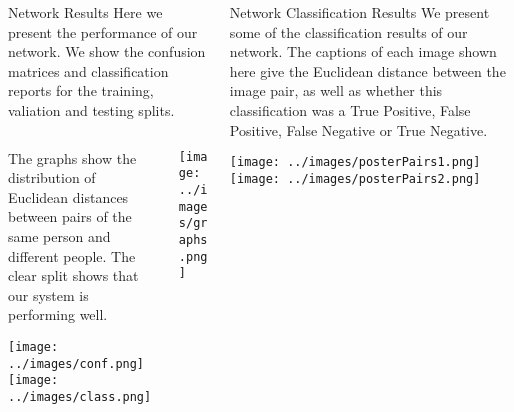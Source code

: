 \documentclass[final]{beamer}
\begin{document}
\begin{frame}{}
\begin{columns}[t]
\begin{column}{.5\linewidth}
        \begin{block}{Network Results}
        Here we present the performance of our network. We show the confusion matrices and classification reports for the training, valiation and testing splits. 
		    \begin{columns}[t]
		    
				\begin{column}{.45\linewidth}
				
				The graphs show the distribution of Euclidean distances between pairs of the same person and different people. The clear split shows that our system is performing well.
				
				\vspace{1cm}
				\texttt{[image: ../images/conf.png]}  
				\vspace{.5cm}
			 	\texttt{[image: ../images/class.png]}
			 	  
				\end{column}
		
				\begin{column}{.45\linewidth}
				
					\texttt{[image: ../images/graphs.png]}
					  
				\end{column}
		
		
			\end{columns}
		
 		
        \end{block}
        
        
    
    
	 \end{column}
	 \begin{column}{.5\linewidth}
 		
 		\begin{block}{Network Classification Results}
        We present some of the classification results of our network. The captions of each image shown here give the Euclidean distance between the image pair, as well as whether this classification was a True Positive, False Positive, False Negative or True Negative. 
        
 		\texttt{[image: ../images/posterPairs1.png]}  
 		\hspace{.1cm}
 		\texttt{[image: ../images/posterPairs2.png]} 
 		
        \end{block}
        

\end{column}
\end{columns}
\end{frame}
\end{document}
